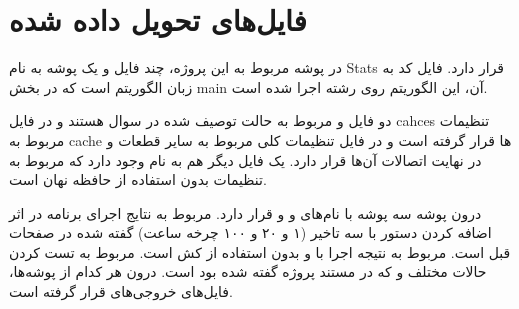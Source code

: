 \documentclass[12pt,titlepage,a4page , tikz , multi,table , svgnames,xcdraw]{article}
\begin{document}
\begin{center}
\begin{latin}
\end{latin}
\end{center}

\newpage
\section{فایل‌های تحویل داده شده}
در پوشه مربوط به این پروژه،‌ چند فایل و یک پوشه به نام Stats قرار دارد. فایل  کد به زبان  الگوریتم  است که در بخش main آن،‌ این الگوریتم روی رشته 
اجرا شده است.

دو فایل  و  مربوط به حالت توصیف شده در سوال هستند و در فایل cahces تنظیمات مربوط به cache ها قرار گرفته است و در فایل  تنظیمات کلی مربوط به سایر قطعات و در نهایت اتصالات آن‌ها قرار دارد. یک فایل دیگر هم به نام  وجود دارد که مربوط به تنظیمات بدون استفاده از حافظه نهان است.


درون پوشه  سه پوشه با نام‌های  و  و  قرار دارد.  مربوط به نتایج اجرای برنامه در اثر اضافه کردن دستور با سه تاخیر (۱ و ۲۰ و ۱۰۰ چرخه ساعت) گفته شده در صفحات قبل است.  مربوط به نتیجه اجرا با و بدون استفاده از کش است.  مربوط به تست کردن حالات مختلف  و  که در مستند پروژه گفته شده بود است. درون هر کدام از پوشه‌ها، فایل‌های  خروجی‌های  قرار گرفته است.
\end{document}
